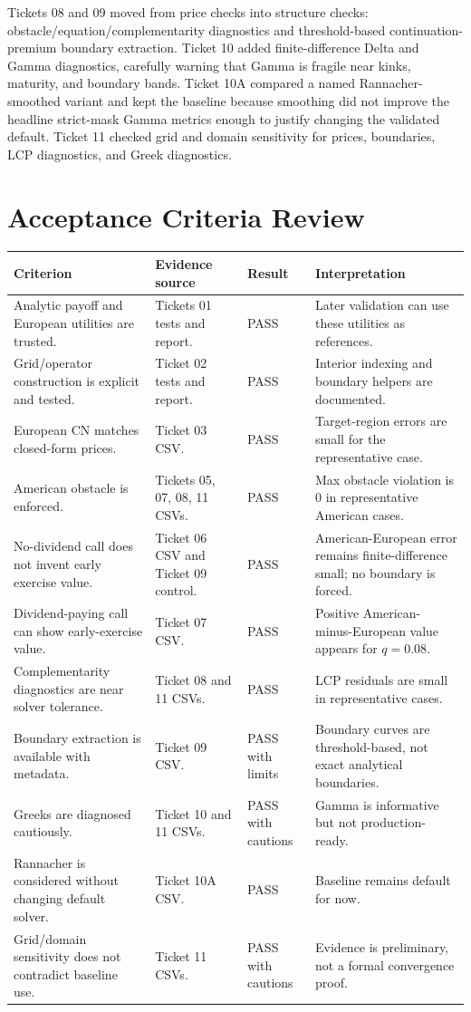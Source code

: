 \documentclass[11pt,a4paper]{article}
\begin{document}
Tickets 08 and 09 moved from price checks into structure checks: obstacle/equation/complementarity diagnostics and threshold-based continuation-premium boundary extraction. Ticket 10 added finite-difference Delta and Gamma diagnostics, carefully warning that Gamma is fragile near kinks, maturity, and boundary bands. Ticket 10A compared a named Rannacher-smoothed variant and kept the baseline because smoothing did not improve the headline strict-mask Gamma metrics enough to justify changing the validated default. Ticket 11 checked grid and domain sensitivity for prices, boundaries, LCP diagnostics, and Greek diagnostics.

\section{Acceptance Criteria Review}

\begin{longtable}{L{0.25\textwidth} L{0.28\textwidth} L{0.18\textwidth} L{0.21\textwidth}}
\toprule
Criterion & Evidence source & Result & Interpretation \\
\midrule
\endhead
Analytic payoff and European utilities are trusted. & Tickets 01 tests and report. & PASS & Later validation can use these utilities as references. \\
Grid/operator construction is explicit and tested. & Ticket 02 tests and report. & PASS & Interior indexing and boundary helpers are documented. \\
European CN matches closed-form prices. & Ticket 03 CSV. & PASS & Target-region errors are small for the representative case. \\
American obstacle is enforced. & Tickets 05, 07, 08, 11 CSVs. & PASS & Max obstacle violation is \(0\) in representative American cases. \\
No-dividend call does not invent early exercise value. & Ticket 06 CSV and Ticket 09 control. & PASS & American-European error remains finite-difference small; no boundary is forced. \\
Dividend-paying call can show early-exercise value. & Ticket 07 CSV. & PASS & Positive American-minus-European value appears for \(q=0.08\). \\
Complementarity diagnostics are near solver tolerance. & Ticket 08 and 11 CSVs. & PASS & LCP residuals are small in representative cases. \\
Boundary extraction is available with metadata. & Ticket 09 CSV. & PASS with limits & Boundary curves are threshold-based, not exact analytical boundaries. \\
Greeks are diagnosed cautiously. & Ticket 10 and 11 CSVs. & PASS with cautions & Gamma is informative but not production-ready. \\
Rannacher is considered without changing default solver. & Ticket 10A CSV. & PASS & Baseline remains default for now. \\
Grid/domain sensitivity does not contradict baseline use. & Ticket 11 CSVs. & PASS with cautions & Evidence is preliminary, not a formal convergence proof. \\
\bottomrule
\end{longtable}
\end{document}
